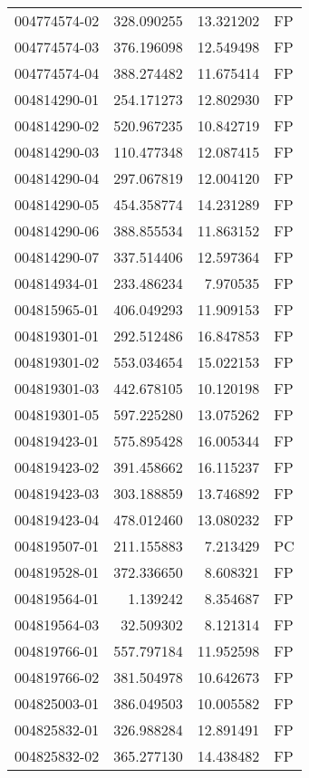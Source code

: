 \begin{tabular}{lrrl}
004774574-02 &  328.090255 &    13.321202 &   FP \\
004774574-03 &  376.196098 &    12.549498 &   FP \\
004774574-04 &  388.274482 &    11.675414 &   FP \\
004814290-01 &  254.171273 &    12.802930 &   FP \\
004814290-02 &  520.967235 &    10.842719 &   FP \\
004814290-03 &  110.477348 &    12.087415 &   FP \\
004814290-04 &  297.067819 &    12.004120 &   FP \\
004814290-05 &  454.358774 &    14.231289 &   FP \\
004814290-06 &  388.855534 &    11.863152 &   FP \\
004814290-07 &  337.514406 &    12.597364 &   FP \\
004814934-01 &  233.486234 &     7.970535 &   FP \\
004815965-01 &  406.049293 &    11.909153 &   FP \\
004819301-01 &  292.512486 &    16.847853 &   FP \\
004819301-02 &  553.034654 &    15.022153 &   FP \\
004819301-03 &  442.678105 &    10.120198 &   FP \\
004819301-05 &  597.225280 &    13.075262 &   FP \\
004819423-01 &  575.895428 &    16.005344 &   FP \\
004819423-02 &  391.458662 &    16.115237 &   FP \\
004819423-03 &  303.188859 &    13.746892 &   FP \\
004819423-04 &  478.012460 &    13.080232 &   FP \\
004819507-01 &  211.155883 &     7.213429 &   PC \\
004819528-01 &  372.336650 &     8.608321 &   FP \\
004819564-01 &    1.139242 &     8.354687 &   FP \\
004819564-03 &   32.509302 &     8.121314 &   FP \\
004819766-01 &  557.797184 &    11.952598 &   FP \\
004819766-02 &  381.504978 &    10.642673 &   FP \\
004825003-01 &  386.049503 &    10.005582 &   FP \\
004825832-01 &  326.988284 &    12.891491 &   FP \\
004825832-02 &  365.277130 &    14.438482 &   FP \\

\end{tabular}
